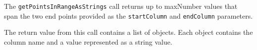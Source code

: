 The \verb+getPointsInRangeAsStrings+ call returns up to maxNumber values that span the two end points provided as the
\verb+startColumn+ and \verb+endColumn+ parameters.

The return value from this call contains a list of objects. Each object contains the column name and a value represented
as a string value.
